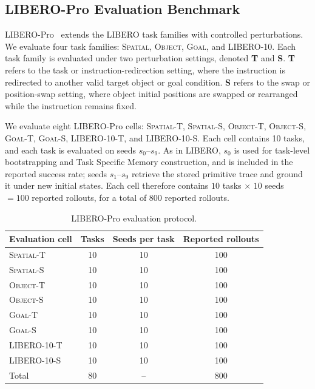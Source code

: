 \documentclass{article}
\begin{document}
\subsection{LIBERO-Pro Evaluation Benchmark}
\label{app:benchmark:liberopro}

LIBERO-Pro~\citep{Lagrange1788} extends the LIBERO task families with controlled perturbations. We evaluate four task families: \textsc{Spatial}, \textsc{Object}, \textsc{Goal}, and \textsc{LIBERO-10}. Each task family is evaluated under two perturbation settings, denoted \textbf{T} and \textbf{S}. \textbf{T} refers to the task or instruction-redirection setting, where the instruction is redirected to another valid target object or goal condition. \textbf{S} refers to the swap or position-swap setting, where object initial positions are swapped or rearranged while the instruction remains fixed.

We evaluate eight LIBERO-Pro cells: \textsc{Spatial-T}, \textsc{Spatial-S}, \textsc{Object-T}, \textsc{Object-S}, \textsc{Goal-T}, \textsc{Goal-S}, \textsc{LIBERO-10-T}, and \textsc{LIBERO-10-S}. Each cell contains 10 tasks, and each task is evaluated on seeds $s_0$--$s_9$. As in LIBERO, $s_0$ is used for task-level bootstrapping and Task Specific Memory construction, and is included in the reported success rate; seeds $s_1$--$s_9$ retrieve the stored primitive trace and ground it under new initial states. Each cell therefore contains $10$ tasks $\times$ $10$ seeds $=100$ reported rollouts, for a total of 800 reported rollouts.

\begin{table}[h]
    \centering
    \caption{LIBERO-Pro evaluation protocol.}
    \label{tab:app_liberopro_protocol}
    \begin{tabular}{lccc}
        \toprule
        Evaluation cell & Tasks & Seeds per task & Reported rollouts \\
        \midrule
        \textsc{Spatial-T}   & 10 & 10 & 100 \\
        \textsc{Spatial-S}   & 10 & 10 & 100 \\
        \textsc{Object-T}    & 10 & 10 & 100 \\
        \textsc{Object-S}    & 10 & 10 & 100 \\
        \textsc{Goal-T}      & 10 & 10 & 100 \\
        \textsc{Goal-S}      & 10 & 10 & 100 \\
        \textsc{LIBERO-10-T} & 10 & 10 & 100 \\
        \textsc{LIBERO-10-S} & 10 & 10 & 100 \\
        \midrule
        Total & 80 & -- & 800 \\
        \bottomrule
    \end{tabular}
\end{table}
\end{document}
